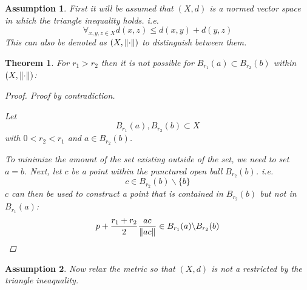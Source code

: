 \documentclass[]{article}
\newtheorem{assumption}{Assumption}
\newtheorem{theorem}{Theorem}
\begin{document}
\begin{assumption}
    First it will be assumed that $(X,d)$ is a normed vector space in which the triangle inequality holds. i.e.\[
        \forall_{x,y,z \in X} d(x,z) \leq d(x,y) + d(y,z)
    \]
    This can also be denoted as $(X,\norm{\cdot})$ to distinguish between them.
\end{assumption}

\begin{theorem}
    For  $r_1 > r_2$ then it is not possible for $B_{r_1}(a) \subset B_{r_2}(b)$ within $(X, \norm{\cdot})$:
    \begin{proof}
        Proof by contradiction.
        
        Let \[
            B_{r_1}(a), B_{r_2}(b) \subset X
        \]
        with $0 < r_2 < r_1$
        and $a \in B_{r_2}(b)$.

        To minimize the amount of the set existing outside of the set,
        we need to set $a = b$.
        Next, let $c$ be a point within the punctured open ball $B_{r_2}(b)$.
        i.e.\[
            c \in B_{r_2}(b) \backslash \{b\}
        \]
        $c$ can then be used to construct a point that is contained in $B_{r_2}(b)$ but not in $B_{r_1}(a)$:
        \[
            p + \frac{r_1 + r_2}{2} \frac{a c}{\norm{a c}} \in B_{r_1}(a) \backslash B_{r_2}(b)
        \]
    \end{proof}
\end{theorem}


\begin{assumption}
    Now relax the metric so that $(X,d)$ is not a restricted by the triangle ineaquality.
\end{assumption}
\end{document}
